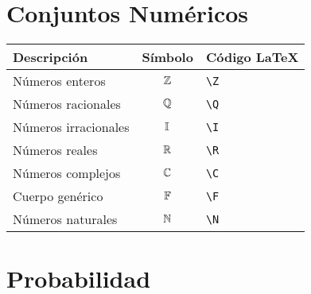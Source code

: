\documentclass{article}
\renewcommand{\arraystretch}{1.75}
\begin{document}
\section{Conjuntos Numéricos}

\renewcommand{\arraystretch}{1.8}
\begin{tabularx}{\textwidth}{@{}l c X@{}}
    \toprule
        Descripción          & Símbolo         & Código \LaTeX                                  \\
    \midrule
        Números enteros      & $\mathbb{Z}$            & \texttt{\textbackslash Z}                      \\
        Números racionales   & $\mathbb{Q}$            & \texttt{\textbackslash Q}                      \\
        Números irracionales & $\mathbb{I}$            & \texttt{\textbackslash I}                      \\
        Números reales       & $\mathbb{R}$            & \texttt{\textbackslash R}                      \\
        Números complejos    & $\mathbb{C}$            & \texttt{\textbackslash C}                      \\
        Cuerpo genérico      & $\mathbb{F}$            & \texttt{\textbackslash F}                      \\
        Números naturales    & $\mathbb{N}$            & \texttt{\textbackslash N}                      \\
    \bottomrule
\end{tabularx}

\section{Probabilidad}
\end{document}
